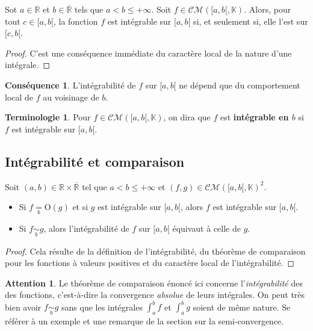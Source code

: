 \documentclass[french]{article}
\newcommand{\R}{\mathbb{R}}
\newcommand{\K}{\mathbb{K}}
\renewcommand{\O}{\text{O}}
\theoremstyle{plain}
\theoremstyle{definition}
\newtheorem*{terminologie}{Terminologie}
\newtheorem*{attention}{Attention}
\newtheorem*{conséquence}{Conséquence}
\theoremstyle{remark}
\begin{document}
\begin{prop}%
	Sot $a\in\R$ et $b\in\overline{\R}$ tels que $a<b\leqslant+\infty$. Soit $f\in\mathcal{CM}([a,b[,\K)$. Alors, pour tout $c\in[a,b[$, la fonction $f$ est intégrable sur $[a,b[$ si, et seulement si, elle l'est sur $[c,b[$.
\end{prop}
\begin{proof}
	C'est une conséquence immédiate du caractère local de la nature d'une intégrale.
\end{proof}

\begin{conséquence}
	L'intégrabilité de $f$ sur $[a,b[$ ne dépend que du comportement local de $f$ au voisinage de $b$.
\end{conséquence}

\begin{terminologie}
	Pour $f\in\mathcal{CM}([a,b[,\K)$, on dira que $f$ est \textbf{intégrable en $b$} si $f$ est intégrable sur $[a,b[$.
\end{terminologie}

\subsection{Intégrabilité et comparaison}

\begin{thm}%
	Soit $(a,b)\in\R\times\overline{\R}$ tel que $a<b\leqslant+\infty$ et $(f,g)\in\mathcal{CM}([a,b[,\K)^2$.
	\begin{itemize}
		\item Si $f\underset{b}{=}\O(g)$ et si $g$ est intégrable sur $[a,b[$, alors $f$ est intégrable sur $[a,b[$.
		\item Si $f\underset{b}{\sim}g$, alors l'intégrabilité de $f$ sur $[a,b[$ équivaut à celle de $g$.
	\end{itemize}
\end{thm}
\begin{proof}
	Cela résulte de la définition de l'intégrabilité, du théorème de comparaison pour les fonctions à valeurs positives et du caractère local de l'intégrabilité.
\end{proof}

\begin{attention}
	Le théorème de comparaison énoncé ici concerne l'\textit{intégrabilité} des des fonctions, c'est-à-dire la convergence \textit{absolue} de leurs intégrales. On peut très bien avoir $f\underset{b}{\sim}g$ sans que les intégrales $\displaystyle\int_{a}^{b}f$ et $\displaystyle\int_{a}^{b}g$ soient de même nature. Se référer à un exemple et une remarque de la section sur la semi-convergence.
\end{attention}
\end{document}
